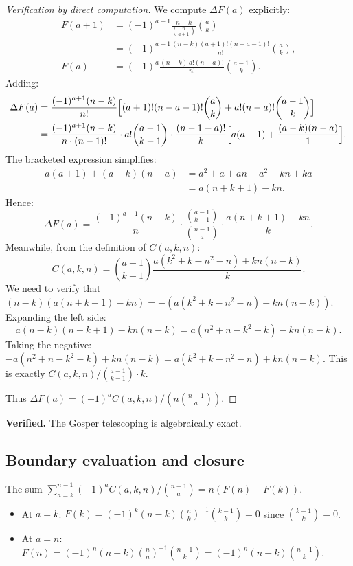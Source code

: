 \documentclass[12pt, a4paper]{amsart}
\theoremstyle{plain}
\theoremstyle{definition}
\theoremstyle{remark}
\begin{document}
\begin{proof}[Verification by direct computation]
We compute $\Delta F(a)$ explicitly:
\begin{align*}
  F(a+1) &= (-1)^{a+1}\frac{n-k}{\binom{n}{a+1}}\binom{a}{k}\\
         &= (-1)^{a+1}\frac{(n-k)(a+1)!(n-a-1)!}{n!}\binom{a}{k},\\[6pt]
  F(a)   &= (-1)^a\frac{(n-k)\,a!(n-a)!}{n!}\binom{a-1}{k}.
\end{align*}
Adding:
\begin{align*}
  \Delta F(a)
  &= \frac{(-1)^{a+1}(n-k)}{n!}
     \Bigl[(a+1)!(n-a-1)!\binom{a}{k} + a!(n-a)!\binom{a-1}{k}\Bigr]\\
  &= \frac{(-1)^{a+1}(n-k)}{n\cdot(n-1)!}
     \cdot a!\binom{a-1}{k-1}\cdot\frac{(n-1-a)!}{k}
     \Bigl[a(a+1)+\frac{(a-k)(n-a)}{1}\Bigr].
\end{align*}
The bracketed expression simplifies:
\begin{align*}
  a(a+1)+(a-k)(n-a)
  &= a^2+a+an-a^2-kn+ka\\
  &= a(n+k+1)-kn.
\end{align*}
Hence:
\[
  \Delta F(a)
  = \frac{(-1)^{a+1}(n-k)}{n}\cdot\frac{\binom{a-1}{k-1}}{\binom{n-1}{a}}
    \cdot\frac{a(n+k+1)-kn}{k}.
\]
Meanwhile, from the definition of $C(a,k,n)$:
\[
  C(a,k,n) = \binom{a-1}{k-1}\frac{a(k^2+k-n^2-n)+kn(n-k)}{k}.
\]
We need to verify that $(n-k)(a(n+k+1)-kn) = -(a(k^2+k-n^2-n)+kn(n-k))$.
Expanding the left side:
\[
  a(n-k)(n+k+1) - kn(n-k)
  = a(n^2+n-k^2-k) - kn(n-k).
\]
Taking the negative: $-a(n^2+n-k^2-k)+kn(n-k) = a(k^2+k-n^2-n)+kn(n-k)$.
This is exactly $C(a,k,n)/\binom{a-1}{k-1}\cdot k$.

Thus $\Delta F(a) = (-1)^a C(a,k,n)/(n\binom{n-1}{a})$.  \checkmark
\end{proof}

\textcolor{verified}{\textbf{Verified.}}  The Gosper telescoping is algebraically exact.

\subsection{Boundary evaluation and closure}

The sum $\sum_{a=k}^{n-1}(-1)^a C(a,k,n)/\binom{n-1}{a} = n(F(n)-F(k))$.

\begin{itemize}
  \item At $a=k$: $F(k) = (-1)^k(n-k)\binom{n}{k}^{-1}\binom{k-1}{k} = 0$
        since $\binom{k-1}{k}=0$.
  \item At $a=n$: $F(n) = (-1)^n(n-k)\binom{n}{n}^{-1}\binom{n-1}{k}
                         = (-1)^n(n-k)\binom{n-1}{k}$.
\end{itemize}
\end{document}
